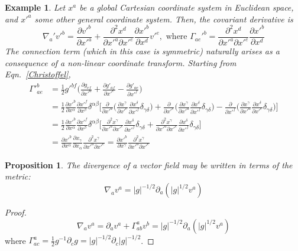 \documentclass[a4paper]{article}
\newtheorem{eg}{Example}[section]
\theoremstyle{new}
\newtheorem{prop}{Proposition}[section]
\begin{document}
\begin{eg}
Let $x^a$ be a global Cartesian coordinate system in Euclidean space, and $x'^a$ some other general coordinate system. Then, the covariant derivative is
$$\nabla_a'v'^b=\frac{\partial v'^b}{\partial x'^a}+\frac{\partial^2x^d}{\partial x'^a\partial x'^e}\frac{\partial x'^b}{\partial x^d}v'^e,\text{ where }\Gamma_{ae}'^b=\frac{\partial^2x^d}{\partial x'^a\partial x'^e}\frac{\partial x'^b}{\partial x^d}$$
The connection term (which in this case is symmetric) naturally arises as a consequence of a non-linear coordinate transform. Starting from Eqn.~\ref{Christoffel},
\begin{align}
    \Gamma'^b_{ae}&=\frac{1}{2}g'^{bf}\bigg(\frac{\partial g_{ef}}{\partial x'^a}+\frac{\partial g'_{af}}{\partial x'^e}-\frac{\partial g'_{ae}}{\partial x'^f}\bigg)\nonumber\\
    &=\frac{1}{2}\frac{\partial x'^b}{\partial x^\alpha}\frac{\partial x'^f}{\partial x^\beta}\delta^{\alpha\beta}\bigg[\frac{\partial}{\partial x'^a}\bigg(\frac{\partial x^\gamma}{\partial x'^e}\frac{\partial x^\delta}{\partial x'^f}\delta_{\gamma\delta}\bigg)+\frac{\partial}{\partial x'^e}\bigg(\frac{\partial x^\gamma}{\partial x'^a}\frac{\partial x^\delta}{\partial x'^f}\delta_{\gamma\delta}\bigg)-\frac{\partial}{\partial x'^f}\bigg(\frac{\partial x^\gamma}{\partial x'^a}\frac{\partial x^\delta}{\partial x'^e}\delta_{\gamma\delta}\bigg)\bigg]\nonumber\\
    &=\frac{1}{2}\frac{\partial x'^b}{\partial x^\alpha}\frac{\partial x'^f}{\partial x^\beta}\delta^{\alpha\beta}\bigg[\frac{\partial^2x^\gamma}{\partial x'^a\partial x'^e}\frac{\partial x^\delta}{\partial x'^f}\delta_{\gamma\delta}+\frac{\partial^2x^\gamma}{\partial x'^a\partial x'^e}\frac{\partial x^\delta}{\partial x'^f}\delta_{\gamma\delta}\bigg]\nonumber\\
    &=\frac{\partial x'^b}{\partial x^\alpha}\frac{\partial x_\gamma}{\partial x_\alpha}\frac{\partial^2x^\gamma}{\partial x'^a\partial x'^e}=\frac{\partial x'^b}{\partial x^\gamma}\frac{\partial^2x^\gamma}{\partial x'^a\partial x'^e}\nonumber
\end{align}
\end{eg}
\begin{prop}
The divergence of a vector field may be written in terms of the metric:
\begin{equation}
\nabla_av^a=|g|^{-1/2}\partial_a(|g|^{1/2}v^a)\label{div}
\end{equation}
\end{prop}
\begin{proof}
$$\nabla_av^a=\partial_av^a+\Gamma_{ab}^av^b=|g|^{-1/2}\partial_a(|g|^{1/2}v^a)$$
where $\Gamma_{ac}^a=\frac{1}{2}g^{-1}\partial_cg=|g|^{-1/2}\partial_c|g|^{-1/2}$.
\end{proof}
\end{document}
